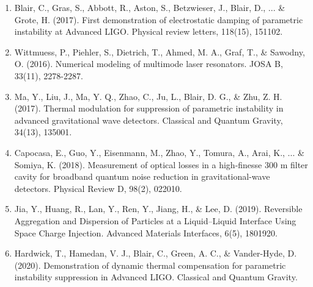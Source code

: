 \begin{enumerate}
\item Blair, C., Gras, S., Abbott, R., Aston, S., Betzwieser, J., Blair, D., ... \& Grote, H. (2017). First demonstration of electrostatic damping of parametric instability at Advanced LIGO. Physical review letters, 118(15), 151102.

\item Wittmuess, P., Piehler, S., Dietrich, T., Ahmed, M. A., Graf, T., \& Sawodny, O. (2016). Numerical modeling of multimode laser resonators. JOSA B, 33(11), 2278-2287.

\item Ma, Y., Liu, J., Ma, Y. Q., Zhao, C., Ju, L., Blair, D. G., \& Zhu, Z. H. (2017). Thermal modulation for suppression of parametric instability in advanced gravitational wave detectors. Classical and Quantum Gravity, 34(13), 135001.

\item Capocasa, E., Guo, Y., Eisenmann, M., Zhao, Y., Tomura, A., Arai, K., ... \& Somiya, K. (2018). Measurement of optical losses in a high-finesse 300 m filter cavity for broadband quantum noise reduction in gravitational-wave detectors. Physical Review D, 98(2), 022010.

\item Jia, Y., Huang, R., Lan, Y., Ren, Y., Jiang, H., \& Lee, D. (2019). Reversible Aggregation and Dispersion of Particles at a Liquid–Liquid Interface Using Space Charge Injection. Advanced Materials Interfaces, 6(5), 1801920.

\item Hardwick, T., Hamedan, V. J., Blair, C., Green, A. C., \& Vander-Hyde, D. (2020). Demonstration of dynamic thermal compensation for parametric instability suppression in Advanced LIGO.  Classical and Quantum Gravity.

\end{enumerate}
